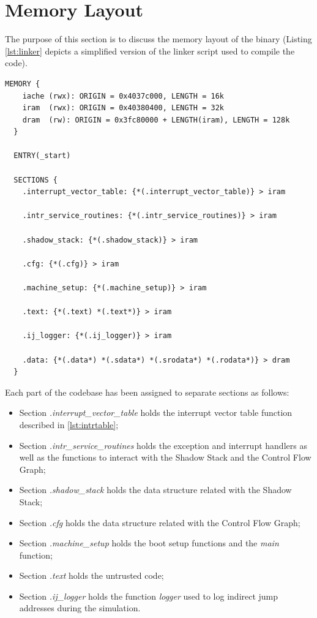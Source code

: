 \section{Memory Layout}
\label{sec:layout}

The purpose of this section is to discuss the memory layout of the binary (Listing
\ref{lst:linker} depicts a simplified version of the linker script used to
compile the code). \\
\begin{lstlisting}[style=CStyle, caption= Simplified linker script, label={lst:linker}]
  MEMORY {
    iache (rwx): ORIGIN = 0x4037c000, LENGTH = 16k
    iram  (rwx): ORIGIN = 0x40380400, LENGTH = 32k
    dram  (rw): ORIGIN = 0x3fc80000 + LENGTH(iram), LENGTH = 128k
  }

  ENTRY(_start)

  SECTIONS {
    .interrupt_vector_table: {*(.interrupt_vector_table)} > iram

    .intr_service_routines: {*(.intr_service_routines)} > iram

    .shadow_stack: {*(.shadow_stack)} > iram

    .cfg: {*(.cfg)} > iram

    .machine_setup: {*(.machine_setup)} > iram

    .text: {*(.text) *(.text*)} > iram

    .ij_logger: {*(.ij_logger)} > iram

    .data: {*(.data*) *(.sdata*) *(.srodata*) *(.rodata*)} > dram
  }
\end{lstlisting}

Each part of the codebase has been assigned to separate sections as follows:
\begin{itemize}
  \item Section \textit{.interrupt\_vector\_table} holds the interrupt vector
    table function described in \ref{lst:intrtable};

  \item Section \textit{.intr\_service\_routines} holds the exception and
    interrupt handlers as well as the functions to interact with the Shadow
    Stack and the Control Flow Graph;

  \item Section \textit{.shadow\_stack} holds the data structure related with
    the Shadow Stack;

  \item Section \textit{.cfg} holds the data structure related with the Control
    Flow Graph;

  \item Section \textit{.machine\_setup} holds the boot setup functions and the
    \textit{main} function;

  \item Section \textit{.text} holds the untrusted code;

  \item Section \textit{.ij\_logger} holds the function \textit{logger} used to log
    indirect jump addresses during the simulation.
\end{itemize}

